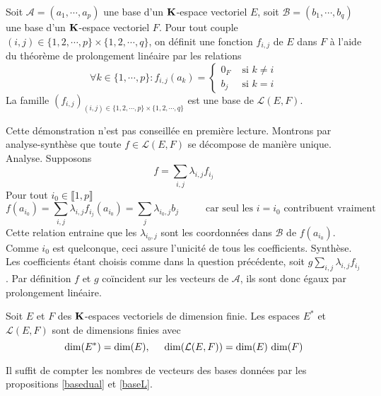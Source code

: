\begin{propn} \label{baseL}
Soit $\mathcal{A}=(a_1,\cdots,a_p)$ une base d'un $\mathbf{K}$-espace vectoriel $E$, soit $\mathcal{B}=(b_1,\cdots,b_q)$ une base d'un $\mathbf{K}$-espace vectoriel $F$. Pour tout couple $(i,j)\in\{1,2,\cdots,p\}\times\{1,2,\cdots,q\}$, on définit une fonction $f_{i,j}$ de $E$ dans $F$ à l'aide du théorème de prolongement linéaire par les relations
\begin{displaymath}
 \forall k \in\{1,\cdots,p\} :  f_{i,j}(a_k) =
\left\lbrace 
\begin{aligned}
 0_F &\text{ si } k\neq i \\
 b_j &\text{ si } k=i
\end{aligned}
\right. 
\end{displaymath}
La famille $(f_{i,j})_{(i,j)\in\{1,2,\cdots,p\}\times\{1,2,\cdots,q\}}$ est une base de $\mathcal L(E,F)$.
\end{propn}
\begin{demo}
 Cette démonstration n'est pas conseillée en première lecture. \newline
 Montrons par analyse-synthèse que toute $f\in \mathcal L(E,F)$ se décompose de manière unique.\newline
Analyse. Supposons
\begin{displaymath}
  f= \sum_{i,j}\lambda_{i,j}f_{i_j}
\end{displaymath}
Pour tout $i_0\in \llbracket 1,p \rrbracket$
\begin{displaymath}
  f(a_{i_0}) = \sum_{i,j}\lambda_{i,j}f_{i_j}(a_{i_0})
  = \sum_{j}\lambda_{i_0,j}b_j \hspace{1cm} \text{ car seul les $i=i_0$ contribuent vraiment}
\end{displaymath}
Cette relation entraine que les $\lambda_{i_0,j}$ sont les coordonnées dans $\mathcal{B}$ de $f(a_{i_0})$. Comme $i_0$ est quelconque, ceci assure l'unicité de tous les coefficients.\newline
Synthèse. Les coefficients étant choisis comme dans la question précédente, soit $g\sum_{i,j}\lambda_{i,j}f_{i_j}$. Par définition $f$ et $g$ coïncident sur les vecteurs de $\mathcal{A}$, ils sont donc égaux par prolongement linéaire.
\end{demo}

\begin{propn}
  Soit $E$ et $F$ des $\mathbf{K}$-espaces vectoriels de dimension finie. Les espaces $E^*$ et $\mathcal{L}(E,F)$ sont de dimensions finies avec
\begin{displaymath}
  \dim(E^*) = \dim(E),\hspace{0.5cm} \dim(\mathcal{L}(E,F)) = \dim(E) \, \dim(F)
\end{displaymath}
\end{propn}
\begin{demo}
 Il suffit de compter les nombres de vecteurs des bases données par les propositions \ref{basedual} et \ref{baseL}. 
\end{demo}

